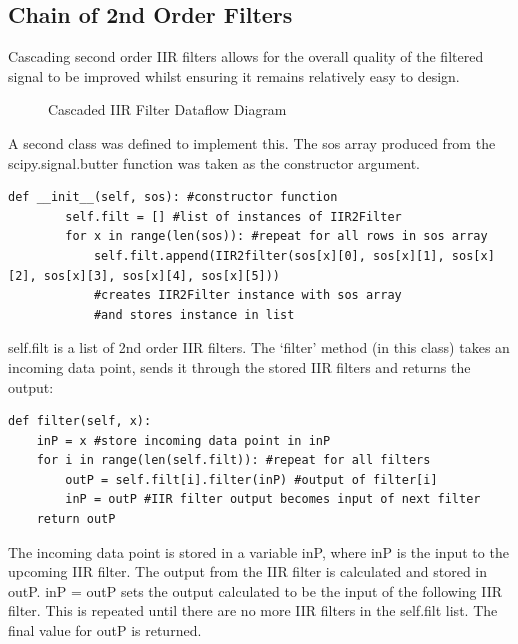\documentclass{article}
\begin{document}
\subsection{Chain of 2nd Order Filters}
Cascading second order IIR filters allows for the overall quality of the filtered signal to be improved whilst ensuring it remains relatively easy to design.
\begin{figure}[H]
    \centering
    
    \caption{Cascaded IIR Filter Dataflow Diagram}
    \label{fig:dataFlow}
\end{figure}
A second class was defined to implement this. The sos array produced from the scipy.signal.butter function was taken as the constructor argument.
\begin{lstlisting}
def __init__(self, sos): #constructor function
        self.filt = [] #list of instances of IIR2Filter
        for x in range(len(sos)): #repeat for all rows in sos array
            self.filt.append(IIR2filter(sos[x][0], sos[x][1], sos[x][2], sos[x][3], sos[x][4], sos[x][5]))
            #creates IIR2Filter instance with sos array
            #and stores instance in list
\end{lstlisting}
self.filt is a list of 2nd order IIR filters. The `filter' method (in this class) takes an incoming data point, sends it through the stored IIR filters and returns the output:
\begin{lstlisting}
def filter(self, x): 
    inP = x #store incoming data point in inP
    for i in range(len(self.filt)): #repeat for all filters
        outP = self.filt[i].filter(inP) #output of filter[i]
        inP = outP #IIR filter output becomes input of next filter
    return outP
\end{lstlisting}
The incoming data point is stored in a variable inP, where inP is the input to the upcoming IIR filter. The output from the IIR filter is calculated and stored in outP. inP = outP sets the output calculated to be the input of the following IIR filter. This is repeated until there are no more IIR filters in the self.filt list. The final value for outP is returned.
\end{document}
